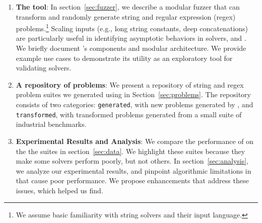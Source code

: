 \begin{enumerate}
\item \textbf{The \fuzzer{} tool}:
    In section~\ref{sec:fuzzer}, we describe a modular fuzzer that can
    transform and randomly generate \smtfull{} string and regular
    expression (regex) problems.\footnote{We assume basic
    familiarity with string solvers and their input
    language.} Scaling inputs (e.g., long string
    constants, deep concatenations) are particularly useful in
    identifying asymptotic behaviors in solvers, and \fuzzer{}.
    We briefly document \fuzzer{}'s
    components and modular architecture. We provide example use cases to
    demonstrate its utility as an exploratory tool for validating
    solvers.

\item \textbf{A repository of \smtfull{} problems}:
    We present a repository of \smtfull{} string and regex problem suites we
    generated using \fuzzer{} in Section~\ref{sec:problems}. The repository
    consists of two categories: \texttt{generated}, with new problems generated
    by \fuzzer{}, and \texttt{transformed}, with transformed problems generated
    from a small suite of industrial benchmarks.

\item \textbf{Experimental Results and Analysis}:
    We compare the performance of \theSolvers{} on the
    the \fuzzer{} suites \theSuites{} in section~\ref{sec:data}. We highlight
    these suites because they make some solvers perform poorly,
    but not others. In section~\ref{sec:analysis}, we analyze our
    experimental results, and pinpoint algorithmic limitations
    in \us{} that cause poor performance. We propose enhancements that
    address these issues, which \fuzzer{} helped us find.
\end{enumerate}
